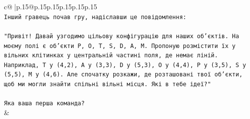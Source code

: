 \documentclass{article}
\begin{document}
{\begin{supertabular}{c@{$\;$}|p{.15\linewidth}@{}p{.15\linewidth}p{.15\linewidth}p{.15\linewidth}p{.15\linewidth}p{.15\linewidth}}
{{{\\ 
\texttt{Інший гравець почав гру, надіславши це повідомлення:} \\
\\ 
\texttt{"Привіт! Давай узгодимо цільову конфігурацію для наших об'єктів. На моєму полі є об'єкти P, O, T, S, D, A, M. Пропоную розмістити їх у вільних клітинках у центральній частині поля, де немає ліній. Наприклад, T у (4,2), A у (3,3), D у (5,3), O у (4,4), P у (3,5), S у (5,5), M у (4,6). Але спочатку розкажи, де розташовані твої об'єкти, щоб ми могли знайти спільні вільні місця. Які в тебе ідеї?"} \\
\\ 
\texttt{Яка ваша перша команда?} \\
            }
        }
    }
    & \\ \\


\end{supertabular}}
\end{document}
